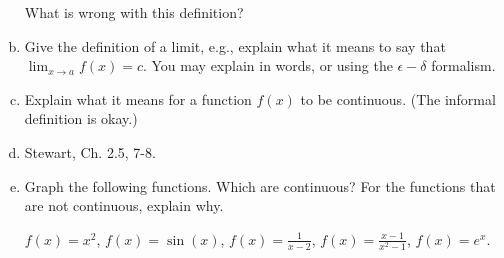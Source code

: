 \documentclass[12pt]{article}
\begin{document}
\begin{enumerate}[(a)]
What is wrong with this definition?

\item
Give the definition of a limit, e.g., 
explain what it means to say that $\lim_{x \rightarrow a} f(x) = c$.
You may explain in words, or using the $\epsilon-\delta$ formalism.

\item 
Explain what it means for a function $f(x)$ to be continuous.
(The informal definition is okay.)

\item
Stewart, Ch. 2.5, 7-8.

\item
Graph the following functions. Which are continuous? For the functions
that are not continuous, explain why.

$f(x) = x^2$, $f(x) = \sin(x)$, $f(x) = \frac{1}{x - 2}$,
$f(x) = \frac{x - 1}{x^2 - 1}$, $f(x) = e^x.$

\end{enumerate}
\end{document}
